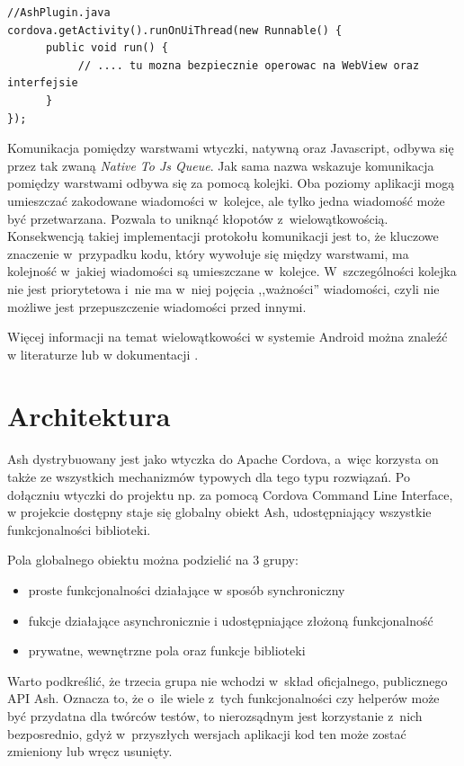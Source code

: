 \documentclass[brudnopis]{xmgr}
\begin{document}
\begin{lstlisting}
//AshPlugin.java
cordova.getActivity().runOnUiThread(new Runnable() {
      public void run() {
           // .... tu mozna bezpiecznie operowac na WebView oraz interfejsie
      }
});
\end{lstlisting}

Komunikacja pomiędzy warstwami wtyczki, natywną oraz Javascript, odbywa się przez tak zwaną \textit{Native To Js Queue}. Jak sama nazwa wskazuje komunikacja pomiędzy warstwami odbywa się za pomocą kolejki. Oba poziomy aplikacji mogą umieszczać zakodowane wiadomości w~kolejce, ale tylko jedna wiadomość może być przetwarzana. Pozwala to uniknąć kłopotów z~wielowątkowością. Konsekwencją takiej implementacji protokołu komunikacji jest to, że kluczowe znaczenie w~przypadku kodu, który wywołuje się między warstwami,  ma kolejność w~jakiej wiadomości są umieszczane w~kolejce. W~szczególności kolejka nie jest priorytetowa i~nie ma w~niej pojęcia ,,ważności'' wiadomości, czyli nie możliwe jest przepuszczenie wiadomości przed innymi.

Więcej informacji na temat wielowątkowości w systemie Android można znaleźć w literaturze \cite{AndroidInPractice} lub w dokumentacji \cite{AndroidDoc}. 

\chapter{Architektura}

Ash dystrybuowany jest jako wtyczka do Apache Cordova, a~więc korzysta on także ze wszystkich mechanizmów typowych dla tego typu rozwiązań. Po dołączniu wtyczki do projektu np. za pomocą Cordova Command Line Interface, w projekcie dostępny staje się globalny obiekt Ash, udostępniający wszystkie funkcjonalności biblioteki. 

Pola globalnego obiektu można podzielić na 3 grupy:  
\begin{itemize}
  \item proste funkcjonalności działające w sposób synchroniczny
  \item fukcje działające asynchronicznie i udostępniające złożoną funkcjonalność 
  \item prywatne, wewnętrzne pola oraz funkcje biblioteki
\end{itemize}
Warto podkreślić, że trzecia grupa nie wchodzi w~skład oficjalnego, publicznego API Ash. Oznacza to, że o~ile wiele z~tych funkcjonalności czy helperów może być przydatna dla twórców testów, to nierozsądnym jest korzystanie z~nich bezposrednio, gdyż w~przyszłych wersjach aplikacji kod ten może zostać zmieniony lub wręcz usunięty.
\end{document}
